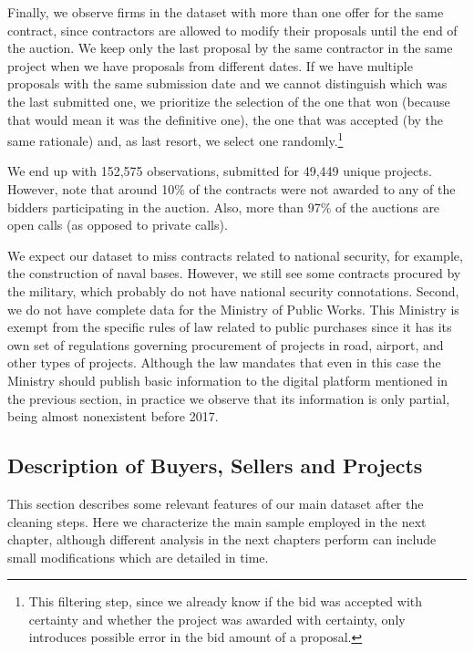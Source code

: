 Finally, we observe firms in the dataset with more than one offer for the same contract, since contractors are allowed to modify their proposals until the end of the auction. We keep only the last proposal by the same contractor in the same project when we have proposals from different dates. If we have multiple proposals with the same submission date and we cannot distinguish which was the last submitted one, we prioritize the selection of the one that won (because that would mean it was the definitive one), the one that was accepted (by the same rationale) and, as last resort, we select one randomly.\footnote{This filtering  step, since we already know if the bid was accepted with certainty and whether the project was awarded with certainty, only introduces possible error in the bid amount of a proposal. }%

We end up with 152,575 observations, submitted for 49,449 unique projects. However, note that around 10\% of the contracts were not awarded to any  of the bidders participating in the auction. Also, more than 97\% of the auctions are open calls (as opposed to private calls).

We expect our dataset to miss contracts related to national security, for example, the construction of naval bases. However, we still see some contracts procured by the military, which probably do not have national security connotations. Second, we do not have complete data for the Ministry of Public Works. This Ministry is exempt from the specific rules of law related to public purchases since it has its own set of regulations governing procurement of projects in road, airport, and other types of projects. Although the law mandates that even in this case the Ministry should publish basic information to the digital platform mentioned in the previous section, in practice we observe that its information is only partial, being almost nonexistent before 2017. %

\subsection{Description of Buyers, Sellers and Projects}
This section describes some relevant features of our main dataset after the cleaning steps. Here we characterize the main sample employed in the next chapter, although different analysis in the next chapters perform can include small modifications which are detailed in time.

